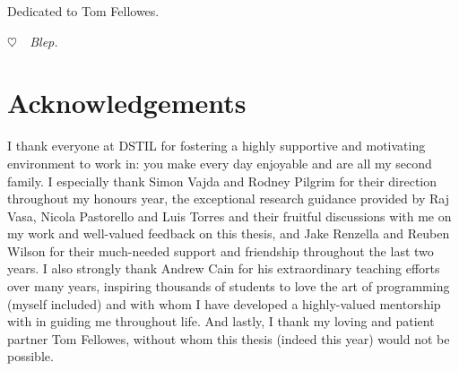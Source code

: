 \cleardoublepage
\pagestyle{empty}
\begin{center}
  \vspace*{0.3\paperheight}
  Dedicated to Tom Fellowes.
  
  {\color{white} \itshape $\heartsuit$~~Blep.}
\end{center}
\pagestyle{fancy}

\chapter*{Acknowledgements}

I thank everyone at DSTIL for fostering a highly supportive and motivating environment to work in: you make every day enjoyable and are all my second family. I especially thank Simon Vajda and Rodney Pilgrim for their direction throughout my honours year, the exceptional research guidance provided by Raj Vasa, Nicola Pastorello and Luis Torres and their fruitful discussions with me on my work and well-valued feedback on this thesis, and Jake Renzella and Reuben Wilson for their much-needed support and friendship throughout the last two years. I also strongly thank Andrew Cain for his extraordinary teaching efforts over many years, inspiring thousands of students to love the art of programming (myself included) and with whom I have developed a highly-valued mentorship with in guiding me throughout life. And lastly, I thank my loving and patient partner Tom Fellowes, without whom this thesis (indeed this year) would not be possible.